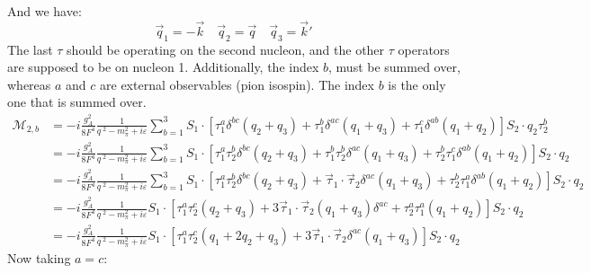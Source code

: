 \documentclass[11pt]{article}
\newcommand\mm{\mathcal{M}}
\begin{document}
And we have:
\begin{equation}
    \vec{q}_1=-\vec{k}\quad \vec{q}_2=\vec{q} \quad \vec{q}_3=\vec{k}'
\end{equation}
The last $\tau$ should be operating on the second nucleon, and the other $\tau$ operators are supposed to be on nucleon 1. Additionally, the index $b$, must be summed over, whereas $a$ and $c$ are external observables (pion isospin). The index $b$ is the only one that is summed over.
\begin{align}
\mm_{2,b}&=-i\frac{g_A^2}{8F^4}\frac{1}{q^{\;2}- m_\pi^2 + i \varepsilon} \sum_{b=1}^3 S_1 \cdot \left[ \tau_1^a \delta^{bc} (q_2+q_3) + \tau_1^b \delta^{ac} (q_1+q_3)+ \tau_1^c \delta^{ab} \left(q_1+q_2\right)\right] S_2 \cdot q_2 \tau^b_2\\
               &=-i\frac{g_A^2}{8F^4}\frac{1}{q^{\;2}- m_\pi^2 + i \varepsilon} \sum_{b=1}^3 S_1 \cdot \left[ \tau_1^a\tau_2^b \delta^{bc} (q_2+q_3) + \tau_1^b \tau_2^b\delta^{ac} (q_1+q_3)+ \tau_2^b\tau_1^c \delta^{ab} \left(q_1+q_2\right)\right] S_2 \cdot q_2\label{Correct}\\
               &=-i\frac{g_A^2}{8F^4}\frac{1}{q^{\;2}- m_\pi^2 + i \varepsilon} \sum_{b=1}^3 S_1 \cdot \left[ \tau_1^a\tau_2^b \delta^{bc} (q_2+q_3) + \vec{\tau}_1 \cdot \vec{\tau}_2 \delta^{ac}(q_1+q_3)+ \tau_2^b\tau_1^a \delta^{ab} \left(q_1+q_2\right)\right] S_2 \cdot q_2\\
    &=-i\frac{g_A^2}{8F^4}\frac{1}{q^{\;2}- m_\pi^2 + i \varepsilon} S_1 \cdot \left[ \tau_1^a\tau_2^c (q_2+q_3) +3\vec{\tau}_1 \cdot \vec{\tau}_2 (q_1+q_3)\delta^{ac}+ \tau_2^a\tau_1^a \left(q_1+q_2\right)\right] S_2 \cdot q_2\\
    &=-i\frac{g_A^2}{8F^4}\frac{1}{q^{\;2}- m_\pi^2 + i \varepsilon} S_1 \cdot \left[ \tau_1^a\tau_2^c (q_1+2q_2+q_3) +3\vec{\tau}_1 \cdot \vec{\tau}_2 \delta^{ac}(q_1+q_3)\right] S_2 \cdot q_2
\end{align}
Now taking $a=c$:
\end{document}
